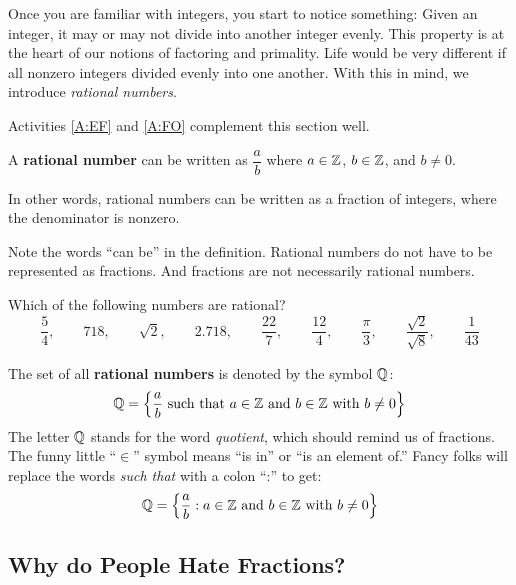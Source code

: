 Once you are familiar with integers, you start to notice something:
Given an integer, it may or may not divide into another integer
evenly. This property is at the heart of our notions of factoring and
primality. Life would be very different if all nonzero integers
divided evenly into one another. With this in mind, we introduce
\textit{rational numbers}.  
\begin{activitynote}
Activities \ref{A:EF} and \ref{A:FO} complement this section well.  
\end{activitynote}



\begin{definition} 
A \textbf{rational number} can be written as $\dfrac{a}{b}$ where $a\in\mathbb Z$, $b\in\mathbb Z$, and $b\ne 0$.
\end{definition}

In other words, rational numbers can be written as a fraction of integers, where the denominator is nonzero.
\begin{warning}
Note the words ``can be'' in the definition.  Rational numbers do not have to be represented as fractions.  And fractions are not necessarily rational numbers.  
\end{warning}

\begin{question}
Which of the following numbers are rational?
$$\frac{5}{4}, \qquad 718, \qquad \sqrt{2}, \qquad 2.718, \qquad \frac{22}{7}, \qquad \frac{12}{4}, \qquad \frac{\pi}{3}, \qquad \frac{\sqrt{2}}{\sqrt{8}}, \qquad \frac{1}{43}$$
\end{question}

The set of all \textbf{rational numbers} is denoted by the symbol $\mathbb Q$: 
\[
      \Q = \left\{\frac{a}{b}\text{ such that $a\in\Z$ and $b\in\Z$ with $b\ne 0$}\right\}\index{Q@$\Q$}\index{e@$\in$}
\]
The letter $\mathbb Q$ stands for the word \textit{quotient}, which should remind us of
fractions.   The funny little ``$\in$'' symbol means ``is in'' or ``is an element of.'' Fancy folks will replace the words \textit{such that} with a colon
``:'' to get:
\[
 \mathbb Q = \left\{\frac{a}{b}:\text{$a\in\mathbb Z$ and $b\in\mathbb Z$ with $b\ne 0$}\right\}
\]


\subsection{Why do People Hate Fractions?}

